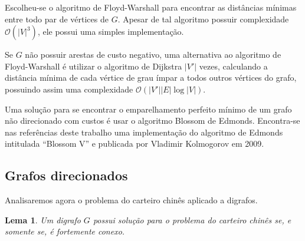 \documentclass[12pt, a4paper]{article}
\newtheorem{lemma}{Lema}
\begin{document}
Escolheu-se o algoritmo de Floyd-Warshall para encontrar as distâncias mínimas entre todo par de vértices de $G$.
Apesar de tal algoritmo possuir complexidade $\mathcal{O}(|V|^3)$, ele possui uma simples implementação.

Se $G$ não possuir arestas de custo negativo, uma alternativa ao algoritmo de Floyd-Warshall é utilizar o algoritmo de Dijkstra $|V'|$ vezes, calculando a distância mínima de cada vértice de grau ímpar a todos outros vértices do grafo, possuindo assim uma complexidade $\mathcal{O}(|V'||E|\log|V|)$. 

Uma solução para se encontrar o emparelhamento perfeito mínimo de um grafo não direcionado com custos é usar o algoritmo Blossom de Edmonds\cite{blossom}. 
Encontra-se nas referências deste trabalho uma implementação do algoritmo de Edmonds intitulada ``Blossom V'' e publicada por Vladimir Kolmogorov em 2009\cite{kolmogorov}.

    \subsection{Grafos direcionados}

    Analisaremos agora o problema do carteiro chinês aplicado a digrafos.

    \begin{lemma}
        Um digrafo $G$ possui solução para o problema do carteiro chinês se, e somente se, é fortemente conexo.
    \end{lemma}
\end{document}

